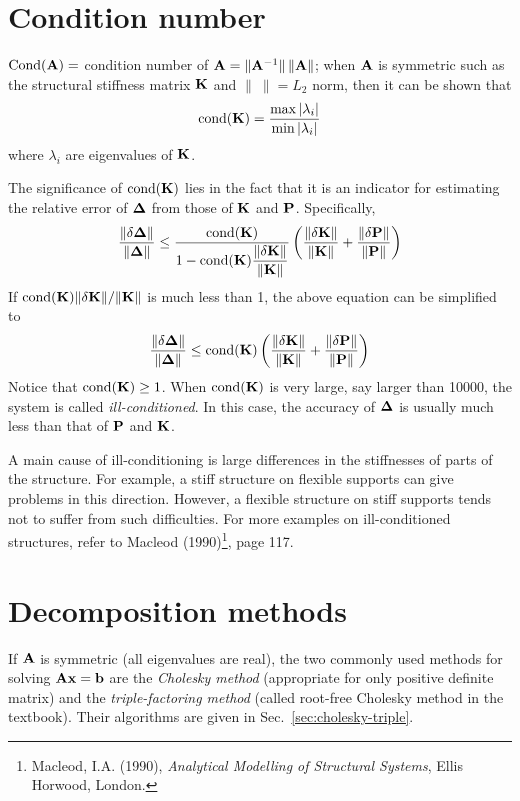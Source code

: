 \section{Condition number}
$\operatorname{Cond}(\mathbf{A}) =$ condition number of $\mathbf{A} = \|\mathbf{A}^{-1}\|\,\|\mathbf{A}\|$; when $\mathbf{A}$ is symmetric such as the structural stiffness matrix $\mathbf{K}$ and $\|\ \| = L_2$ norm, then it can be shown that
\begin{equation}
  \operatorname{cond}(\mathbf{K}) = \frac{\max|\lambda_i|}{\min|\lambda_i|}
\end{equation}
where $\lambda_i$ are eigenvalues of $\mathbf{K}$.

The significance of $\operatorname{cond}(\mathbf{K})$ lies in the fact that it is an indicator for estimating the relative error of $\bm{\Delta}$ from those of $\mathbf{K}$ and $\mathbf{P}$. Specifically,
\begin{equation}
  \frac{\|\delta\bm{\Delta}\|}{\|\bm{\Delta}\|} \leq
  \frac{\operatorname{cond}(\mathbf{K})}{1-\operatorname{cond}(\mathbf{K})\dfrac{\|\delta\mathbf{K}\|}{\|\mathbf{K}\|}}
  \left(\frac{\|\delta\mathbf{K}\|}{\|\mathbf{K}\|} + \frac{\|\delta\mathbf{P}\|}{\|\mathbf{P}\|}\right)
\end{equation}
If $\operatorname{cond}(\mathbf{K})\|\delta\mathbf{K}\|/\|\mathbf{K}\|$ is much less than 1, the above equation can be simplified to
\begin{equation}
  \frac{\|\delta\bm{\Delta}\|}{\|\bm{\Delta}\|} \leq \operatorname{cond}(\mathbf{K})\left(\frac{\|\delta\mathbf{K}\|}{\|\mathbf{K}\|} + \frac{\|\delta\mathbf{P}\|}{\|\mathbf{P}\|}\right)
\end{equation}
Notice that $\operatorname{cond}(\mathbf{K})\geq 1$. When $\operatorname{cond}(\mathbf{K})$ is very large, say larger than 10000, the system is called \emph{ill-conditioned}. In this case, the accuracy of $\bm{\Delta}$ is usually much less than that of $\mathbf{P}$ and $\mathbf{K}$.

A main cause of ill-conditioning is large differences in the stiffnesses of parts of the structure. For example, a stiff structure on flexible supports can give problems in this direction. However, a flexible structure on stiff supports tends not to suffer from such difficulties. For more examples on ill-conditioned structures, refer to Macleod (1990)\footnote{Macleod, I.A. (1990), \emph{Analytical Modelling of Structural Systems}, Ellis Horwood, London.}, page 117.

\section{Decomposition methods}
If $\mathbf{A}$ is symmetric (all eigenvalues are real), the two commonly used methods for solving $\mathbf{A}\mathbf{x}=\mathbf{b}$ are the \emph{Cholesky method} (appropriate for only positive definite matrix) and the \emph{triple-factoring method} (called root-free Cholesky method in the textbook). Their algorithms are given in Sec.~\ref{sec:cholesky-triple}.

